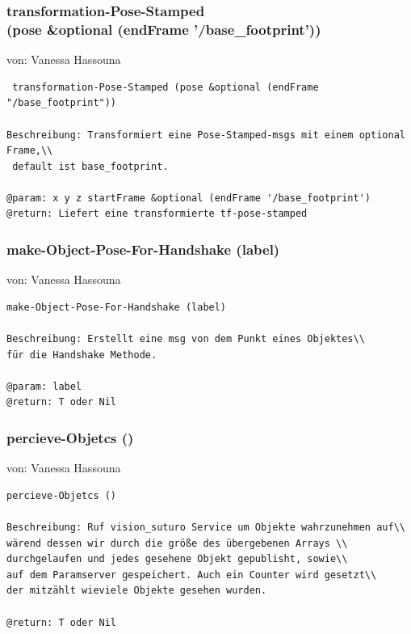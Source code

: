 \documentclass{suturo}
\makeatletter
\newcommand{\chapterauthor}[1]{%
  {\parindent0pt\vspace*{-27pt}%
  \linespread{0}\small\begin{flushright}von: #1\end{flushright}%
  \par\nobreak\vspace*{0pt}}
  \@afterheading%
}
\makeatother
\begin{document}
\subsubsection{ transformation-Pose-Stamped \\
(pose \&optional (endFrame '/base\_footprint')) }
\chapterauthor{Vanessa Hassouna}
\begin{verbatim}
 transformation-Pose-Stamped (pose &optional (endFrame "/base_footprint")) 

Beschreibung: Transformiert eine Pose-Stamped-msgs mit einem optional Frame,\\
 default ist base_footprint.

@param: x y z startFrame &optional (endFrame '/base_footprint')
@return: Liefert eine transformierte tf-pose-stamped
\end{verbatim}




\subsubsection{make-Object-Pose-For-Handshake (label)}
\chapterauthor{Vanessa Hassouna}
\begin{verbatim}
make-Object-Pose-For-Handshake (label)

Beschreibung: Erstellt eine msg von dem Punkt eines Objektes\\ 
für die Handshake Methode.

@param: label
@return: T oder Nil
\end{verbatim}

\subsubsection{ percieve-Objetcs ()}
\chapterauthor{Vanessa Hassouna}
\begin{verbatim}
percieve-Objetcs ()

Beschreibung: Ruf vision_suturo Service um Objekte wahrzunehmen auf\\
wärend dessen wir durch die größe des übergebenen Arrays \\
durchgelaufen und jedes gesehene Objekt gepublisht, sowie\\
auf dem Paramserver gespeichert. Auch ein Counter wird gesetzt\\
der mitzählt wieviele Objekte gesehen wurden.

@return: T oder Nil
\end{verbatim}
\end{document}
